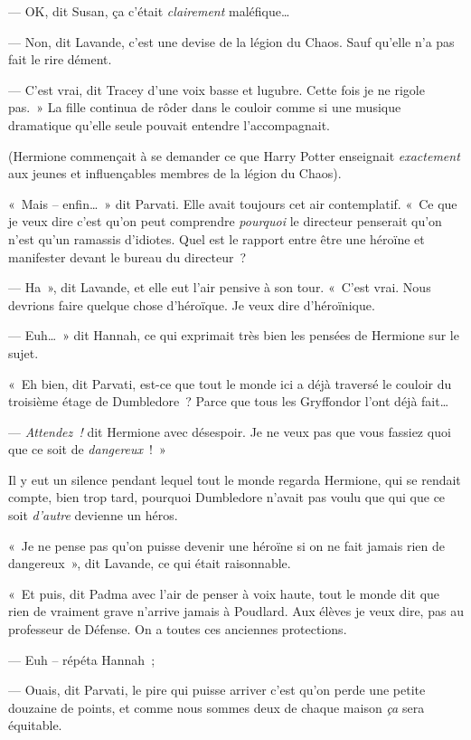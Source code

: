 --- OK, dit Susan, ça c'était \emph{clairement} maléfique…

--- Non, dit Lavande, c'est une devise de la légion du Chaos.
Sauf qu'elle n'a pas fait le rire dément.

--- C'est vrai, dit Tracey d'une voix basse et lugubre.
Cette fois je ne rigole pas.~»
La fille continua de rôder dans le couloir comme si une musique dramatique qu'elle seule pouvait entendre l'accompagnait.

(Hermione commençait à se demander ce que Harry Potter enseignait \emph{exactement} aux jeunes et influençables membres de la légion du Chaos).

«~Mais -- enfin…~»
dit Parvati.
Elle avait toujours cet air contemplatif.
«~Ce que je veux dire c'est qu'on peut comprendre \emph{pourquoi} le directeur penserait qu'on n'est qu'un ramassis d'idiotes.
Quel est le rapport entre être une héroïne et manifester devant le bureau du directeur~?

--- Ha~», dit Lavande, et elle eut l'air pensive à son tour.
«~C'est vrai.
Nous devrions faire quelque chose d'héroïque.
Je veux dire d'héroïnique.

--- Euh…~»
dit Hannah, ce qui exprimait très bien les pensées de Hermione sur le sujet.

«~Eh bien, dit Parvati, est-ce que tout le monde ici a déjà traversé le couloir du troisième étage de Dumbledore~?
Parce que tous les Gryffondor l'ont déjà fait…

--- \emph{Attendez~!} dit Hermione avec désespoir.
Je ne veux pas que vous fassiez quoi que ce soit de \emph{dangereux}~!~»

Il y eut un silence pendant lequel tout le monde regarda Hermione, qui se rendait compte, bien trop tard, pourquoi Dumbledore n'avait pas voulu que qui que ce soit \emph{d'autre} devienne un héros.

«~Je ne pense pas qu'on puisse devenir une héroïne si on ne fait jamais rien de dangereux~», dit Lavande, ce qui était raisonnable.

«~Et puis, dit Padma avec l'air de penser à voix haute, tout le monde dit que rien de vraiment grave n'arrive jamais à Poudlard.
Aux élèves je veux dire, pas au professeur de Défense.
On a toutes ces anciennes protections.

--- Euh -- répéta Hannah~;

--- Ouais, dit Parvati, le pire qui puisse arriver c'est qu'on perde une petite douzaine de points, et comme nous sommes deux de chaque maison \emph{ça} sera équitable.

